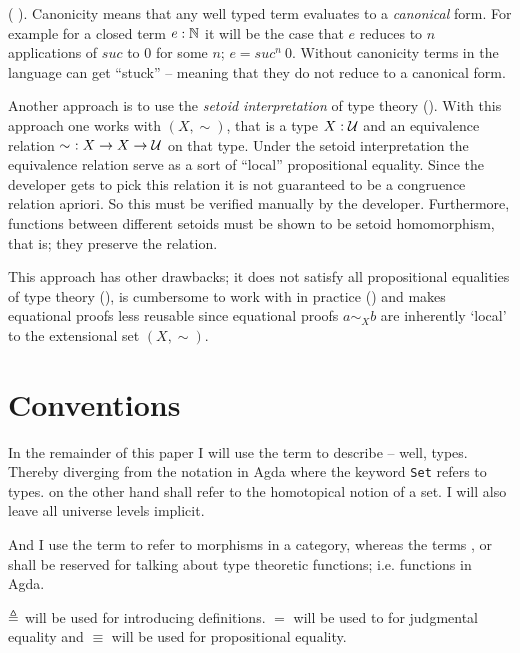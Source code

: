  ( \cite{huber-2016}). Canonicity means that any
well typed term evaluates to a \emph{canonical} form. For example for a closed
term $e \mathrel{:} \mathbb{N}$ it will be the case that $e$ reduces to $n$ applications of
$\mathit{suc}$ to $0$ for some $n$; $e = \mathit{suc}^n\ 0$. Without canonicity
terms in the language can get ``stuck'' -- meaning that they do not reduce to a
canonical form.

Another approach is to use the \emph{setoid interpretation} of type
theory (\cite{hofmann-1995,huber-2016}). With this approach one works
with
 $(X, \sim)$, that is a type $X \mathrel{:} \mathcal{U}$
and an equivalence relation $\sim\ \mathrel{:} X \to X \to \mathcal{U}$ on that type.
Under the setoid interpretation the equivalence relation serve as a
sort of ``local'' propositional equality. Since the developer gets to
pick this relation it is not guaranteed to be a congruence relation
apriori. So this must be verified manually by the developer.
Furthermore, functions between different setoids must be shown to be
setoid homomorphism, that is; they preserve the relation.

This approach has other drawbacks; it does not satisfy
all propositional equalities of type theory (), is
cumbersome to work with in practice (\cite[p. 4]{huber-2016}) and makes
equational proofs less reusable since equational proofs $a \sim_{X} b$ are
inherently `local' to the extensional set $(X , \sim)$.

\section{Conventions}

In the remainder of this paper I will use the term
 to describe --
well, types. Thereby diverging from the notation in Agda where the keyword
\texttt{Set} refers to types.
 on the other hand shall refer to the
homotopical notion of a set. I will also leave all universe levels implicit.

And I use the term
 to refer to morphisms in a category,
whereas the terms
,
 or
shall be reserved for talking about type theoretic functions; i.e.
functions in Agda.

$\mathrel{\triangleq}$ will be used for introducing definitions. $=$ will be used to for
judgmental equality and $\equiv$ will be used for propositional equality.

